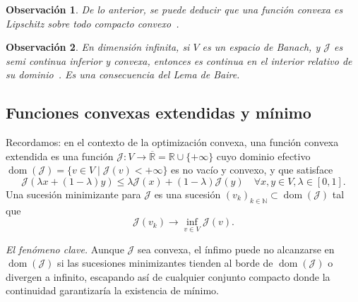 \documentclass[12pt]{book}
\newtheorem{remark}{Observación}
\newcommand{\dom}{\operatorname{dom}}
\theoremstyle{definition}
\theoremstyle{plain}
\theoremstyle{remark}
\begin{document}
\begin{remark}
De lo anterior, se puede deducir que una funci\'on convexa es Lipschitz sobre todo compacto convexo~\cite{hiriart2001}.
\end{remark}

\begin{remark} En dimensión infinita, si $V$ es un espacio de Banach, y $\mathcal{J}$ es semi continua inferior y convexa, entonces es continua en el interior relativo de su dominio~\cite[Proposition 3.6]{peypouquet2015}. Es una consecuencia del Lema de Baire.
\end{remark}


\subsection{Funciones convexas extendidas y mínimo}


Recordamos: en el contexto de la {optimización convexa}, una {función convexa extendida} es una función $\mathcal{J}: V \to \overline{\mathbb{R}} = \mathbb{R} \cup \{+\infty\}$ cuyo {dominio efectivo} $\dom(\mathcal{J}) = \{v \in V \mid \mathcal{J}(v) < +\infty\}$ es no vacío y convexo, y que satisface
\[
\mathcal{J}(\lambda x + (1-\lambda)y) \leq \lambda \mathcal{J}(x) + (1-\lambda)\mathcal{J}(y) \quad \forall x,y \in V, \lambda \in [0,1].
\]
Una {sucesión minimizante} para $\mathcal{J}$ es una sucesión $(v_k)_{k \in \mathbb{N}} \subset \dom(\mathcal{J})$ tal que
\[
\mathcal{J}(v_k) \to \inf_{v \in V} \mathcal{J}(v).
\]

\medskip
\emph{El fenómeno clave.} Aunque $\mathcal{J}$ sea convexa, el ínfimo puede {no alcanzarse} en $\dom(\mathcal{J})$ si las sucesiones minimizantes {tienden al borde} de $\dom(\mathcal{J})$ o {divergen a infinito}, escapando así de cualquier conjunto compacto donde la continuidad garantizaría la existencia de mínimo.
\end{document}
